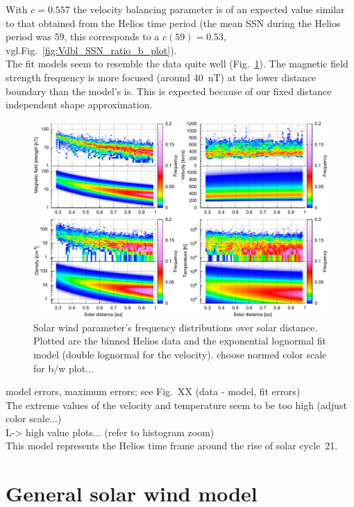 With $c = 0.557$ the velocity balancing parameter is of an expected value similar to that obtained from the Helios time period (the mean SSN during the Helios period was 59, this corresponds to a $c(59) = 0.53$, vgl.Fig.~\ref{fig:Vdbl_SSN_ratio_b_plot}).\\

The fit models seem to resemble the data quite well (Fig.~\ref{fig:mixed_fit_fixed_4_paper_d_plot}). The magnetic field strength frequency is more focused (around \SI{40}{nT}) at the lower distance boundary than the model's is. This is expected because of our fixed distance independent shape approximation.\\
\begin{figure}
	\includegraphics[width=18cm]{figures/mixed_fit_fixed_4_paper_d_plot.pdf}
	\caption{Solar wind parameter's frequency distributions over solar distance. Plotted are the binned Helios data and the exponential lognormal fit model (double lognormal for the velocity). choose normed color scale for b/w plot...}
	\label{fig:mixed_fit_fixed_4_paper_d_plot}
\end{figure}

model errors, maximum errors; see Fig.~XX (data - model, fit errors)\\
The extreme values of the velocity and temperature seem to be too high (adjust color scale...)\\
L-> high value plots... (refer to histogram zoom)\\

This model represents the Helios time frame around the rise of solar cycle~21.


\section{General solar wind model}
\label{sec:general_solar_wind_model}

